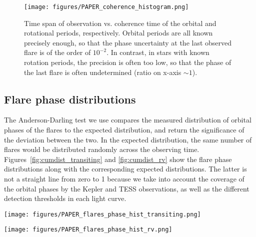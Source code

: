 \documentclass[twocolumn]{aastex631}
\begin{document}
\begin{figure}[ht!]
    \begin{centering}
        \texttt{[image: figures/PAPER\_coherence\_histogram.png]}
        \caption{
           Time span of observation vs. coherence time of the orbital and rotational periods, respectively. Orbital periods are all known precisely enough, so that the phase uncertainty at the last observed flare is of the order of $10^{-2}$. In contrast, in stars with known rotation periods, the precision is often too low, so that the phase of the last flare is often undetermined (ratio on x-axis $\sim 1$).
        }
        \label{fig:coherence_hist}
    \end{centering}
\end{figure}

\subsection{Flare phase distributions}
\label{sec:results:phasedist}
The Anderson-Darling test we use compares the measured distribution of orbital phases of the flares to the expected distribution, and return the significance of the deviation between the two. In the expected distribution, the same number of flares would be distributed randomly across the observing time. Figures~\ref{fig:cumdist_transiting} and \ref{fig:cumdist_rv} show the flare phase distributions along with the corresponding expected distributions. The latter is not a straight line from zero to 1 because we take into account the coverage of the orbital phases by the Kepler and TESS observations, as well as the different detection thresholds in each light curve.

\begin{figure*}[ht!]
    \begin{centering}
        \texttt{[image: figures/PAPER\_flares\_phase\_hist\_transiting.png]}
        \caption{
            Cumulative distributions of orbital phases of flares in the transiting planet hosts observed by Kepler and TESS with 4 or more flares each. Phase zero corresponds to the transit mid-time of the planet.
        }
        \label{fig:cumdist_transiting}
    \end{centering}
\end{figure*}

\begin{figure*}[ht!]
    \begin{centering}
        \texttt{[image: figures/PAPER\_flares\_phase\_hist\_rv.png]}
        \caption{
            Cumulative distributions of orbital phases of flares in the RV planet hosts observed by Kepler and TESS with 4 or more flares each. Phase zero is chosen arbitrarily.
        }
        \label{fig:cumdist_rv}
    \end{centering}
\end{figure*}
\end{document}

